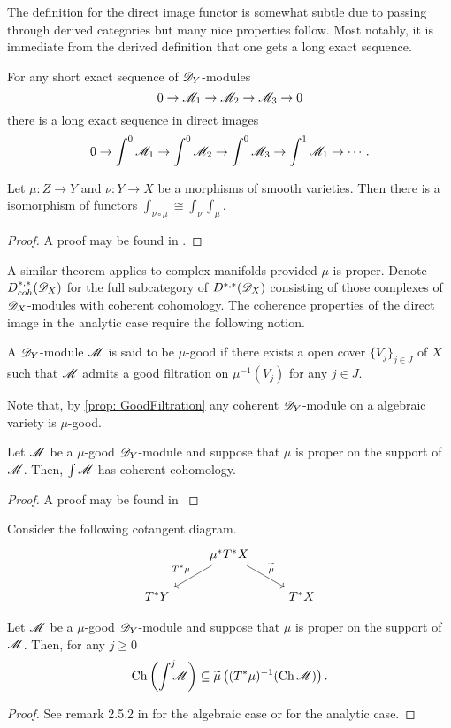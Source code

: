 The definition for the direct image functor is somewhat subtle due to passing through derived categories but many nice properties follow.
Most notably, it is immediate from the derived definition that one gets a long exact sequence.
\begin{proposition}
    For any short exact sequence of $\mathscr{D}_Y$-modules
    $$0 \to \mathscr{M}_1 \to \mathscr{M}_2 \to \mathscr{M}_3 \to 0 $$
    there is a long exact sequence in direct images
    $$0 \to \int^0\mathscr{M}_1 \to \int^0 \mathscr{M}_2 \to \int^0 \mathscr{M}_3 \to \int^1 \mathscr{M}_1 \to \cdots.$$
\end{proposition}
\begin{proposition}
  Let $\mu:Z\to Y$ and $\nu:Y\to X$ be a morphisms of smooth varieties. Then there is a isomorphism of functors $\int_{\nu\circ \mu} \cong \int_\nu \int_\mu$.
\end{proposition}
\begin{proof}
  A proof may be found in \cite[Chapter 6]{borel1987algebraic}.
\end{proof}
A similar theorem applies to complex manifolds provided $\mu$ is proper.
Denote $D_{coh}^{*,*}(\mathscr{D}_X)$ for the full subcategory of $D^{*,*}(\mathscr{D}_X)$ consisting of those complexes of $\mathscr{D}_X$-modules with coherent cohomology.
The coherence properties of the direct image in the analytic case require the following notion.
\begin{definition}
  A $\mathscr{D}_Y$-module $\mathscr{M}$ is said to be $\mu$-good if there exists a open cover $\{V_j\}_{j\in J}$ of $X$ such that $\mathscr{M}$ admits a good filtration on $\mu^{-1}(V_j)$ for any $j\in J$.
\end{definition}
Note that, by \cref{prop: GoodFiltration} any coherent $\mathscr{D}_Y$-module on a algebraic variety is $\mu$-good.
\begin{theorem}\label{thm: MuGoodCoherent}
  Let $\mathscr{M}$ be a $\mu$-good $\mathscr{D}_Y$-module and suppose that $\mu$ is proper on the support of $\mathscr{M}$.
  Then, $\int \mathscr{M}$ has coherent cohomology.
\end{theorem}
\begin{proof}
  A proof may be found in \cite[Chapter 3]{sabbah2011introduction}
\end{proof}
Consider the following cotangent diagram.
$$
\begin{tikzcd}
    & \mu^* T^* X\arrow[swap]{ld}{T^* \mu} \arrow{rd}{\widetilde{\mu}} & \\
    T^* Y & & T^*X
\end{tikzcd}
$$
\begin{proposition}\label{prop: EstimateProper}
  Let $\mathscr{M}$ be a $\mu$-good $\mathscr{D}_Y$-module and suppose that $\mu$ is proper on the support of $\mathscr{M}$. Then, for any $j\geq 0$
  $$\operatorname{Ch}\left(\int^j \mkern -8mu \mathscr{M} \right)\subseteq  \widetilde{\mu}\left((T^*\mu)^{-1}(\operatorname{Ch} \mathscr{M}) \right).$$
\end{proposition}
\begin{proof}
  See remark 2.5.2 in \cite[Chapter 2]{hotta2007d} for the algebraic case or \cite[Chapter 3]{sabbah2011introduction} for the analytic case.
\end{proof}
